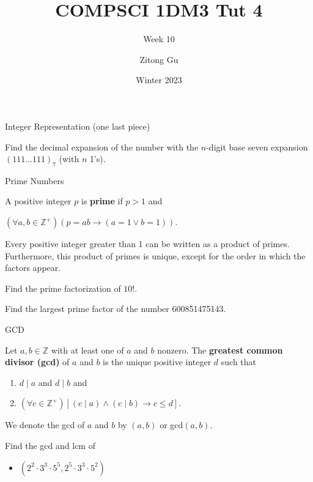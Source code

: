 \documentclass{beamer}
\title{COMPSCI 1DM3 Tut 4}
\subtitle{Week 10}
\author{Zitong Gu}
\institute{McMaster University}
\date{Winter 2023}
\renewcommand{\implies}{\rightarrow}
\let\cd\cdot
\begin{document}
\frame{\titlepage}

\begin{frame}[t]{Integer Representation (one last piece)}
    \begin{example}
        Find the decimal expansion of the number with the $n$-digit base seven expansion $(111 \dots 111)_7$ (with $n$ 1's). 
    \end{example}
\end{frame} 

\begin{frame}[t]{Prime Numbers}
    \begin{definition}
        A positive integer $p$ is \textbf{prime} if $p > 1$ and \begin{center}
            $(\forall a,b \in \mathbb{Z^+})(p = ab \implies (a = 1 \vee b = 1))$.
        \end{center}
    \end{definition}
    \begin{theorem}
        Every positive integer greater than 1 can be written as a product of primes. Furthermore, this product of primes is unique, except for the order in which the factors appear.
    \end{theorem}
    \begin{example}
        Find the prime factorization of $10!$.
    \end{example}
\end{frame} 

\begin{frame}[b]{}
    \begin{example}
        Find the largest prime factor of the number 600851475143. 
    \end{example}
    \vspace{4mm}
\end{frame}

\begin{frame}{GCD}
    \begin{definition}
        Let $a,b \in \mathbb{Z}$ with at least one of $a$ and $b$ nonzero. The \textbf{greatest common divisor (gcd)} of $a$ and $b$ is the unique positive integer $d$ such that \begin{enumerate}
            \item $d \mid a$ and $d \mid b$ and
            \item $(\forall c \in \mathbb{Z^+})[(c \mid a) \wedge (c \mid b) \implies c \leq d]$.
        \end{enumerate} We denote the gcd of $a$ and $b$ by $(a,b)$ or gcd$(a,b)$.
    \end{definition}
    \begin{example}
        Find the gcd and lcm of \begin{itemize}
            \item $(2^2 \cd 3^3 \cd 5^5, 2^5 \cd 3^3 \cd 5^2)$ 
            \vspace{8mm}
        \end{itemize}
    \end{example}
\end{frame}
\end{document}
